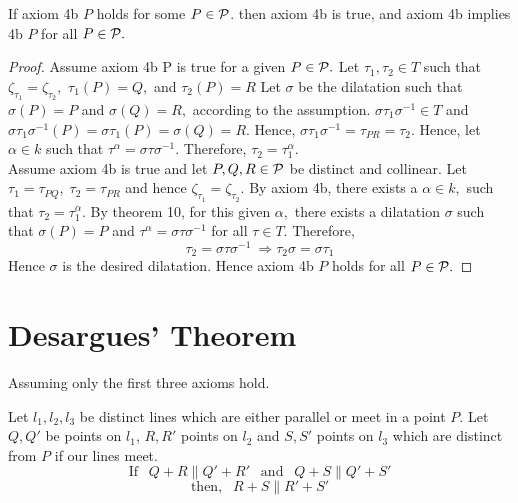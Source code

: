 \begin{theorem}
    If axiom 4b $P$ holds for some $P \in \mathcal{P}$. then axiom 4b is true, and axiom 4b implies 4b $P$ for all $P \in \mathcal{P}.$
\end{theorem}

\begin{proof}
    Assume axiom 4b P is true for a given $P \in \mathcal{P}.$ Let $\tau_1, \tau_2 \in T$ such that $ \zeta_{\tau_1} = \zeta_{\tau_2}, $ $\tau_1(P)=Q,$ and $\tau_2(P)=R$ Let $\sigma$ be the dilatation such that $\sigma(P)=P$ and $\sigma(Q)=R,$ according to the assumption. $\sigma\tau_1\sigma^{-1} \in T$ and $\sigma\tau_1\sigma^{-1}(P) = \sigma\tau_1(P)=\sigma(Q)=R. $ Hence, $\sigma\tau_1\sigma^{-1} = \tau_{PR}=\tau_2.$ Hence, let $\alpha \in k$ such that $\tau^\alpha = \sigma\tau\sigma^{-1}.$ Therefore, $\tau_2=\tau_1^\alpha.$ \\
    Assume axiom 4b is true and let $P,Q,R \in \mathcal{P}$ be distinct and collinear. Let $\tau_1=\tau_{PQ}, \; \tau_2=\tau_{PR} $ and hence $\zeta_{\tau_1} = \zeta_{\tau_2}. $ By axiom 4b, there exists a $\alpha \in k,$ such that $\tau_2=\tau_1^\alpha$. By theorem 10, for this given $\alpha,$ there exists a dilatation $\sigma$ such that $\sigma(P)=P$ and $\tau^{\alpha} = \sigma\tau\sigma^{-1}$ for all $\tau \in T.$ Therefore,
    \[
    \tau_2=\sigma\tau\sigma^{-1} \: \Rightarrow \tau_2\sigma=\sigma\tau_1
    \]
    Hence $\sigma$ is the desired dilatation. Hence axiom 4b $P$ holds for all $P \in \mathcal{P}.$
\end{proof}

\section{Desargues' Theorem}
Assuming only the first three axioms hold. 

\begin{theorem}
    Let $l_1, l_2, l_3$ be distinct lines which are either parallel or meet in a point $P.$ Let $Q, Q'$ be points on $l_1$, $R, R'$ points on $l_2$ and $S, S'$ points on $l_3$ which are distinct from $P$ if our lines meet.
    \[
    \text{If } \: \: Q+R \parallel Q'+R' \: \:  \text{ and } \: \: Q+S \parallel Q' +S'
    \]
    \[
    \text{then, } \: \: R+S \parallel R'+S'
    \]
\end{theorem}

\begin{center}
\end{center}

